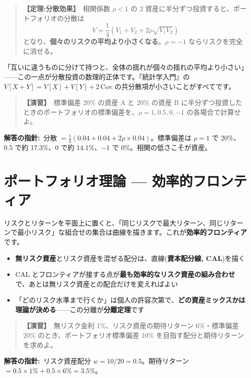 \documentclass{article}
\begin{document}
\begin{quote}
\textbf{【定理:分散効果】}\ 相関係数 \(\rho < 1\) の 2 資産に半分ずつ投資すると、ポートフォリオの分散は
\[ V = \frac{1}{4}(V_1 + V_2 + 2\rho\sqrt{V_1 V_2}) \]
となり、\textbf{個々のリスクの平均より小さくなる}。\(\rho = -1\) ならリスクを完全に消せる。
\end{quote}

「互いに違うものに分けて持つと、全体の揺れが個々の揺れの平均より小さい」——この一点が分散投資の数理的正体です。『統計学入門』の \(V[X+Y] = V[X] + V[Y] + 2\,\mathrm{Cov}\) の共分散項が小さいことがすべてです。

\begin{quote}
\textbf{【演習】}\ 標準偏差 20\% の資産 A と 20\% の資産 B に半分ずつ投資したときのポートフォリオの標準偏差を、\(\rho = 1, 0.5, 0, -1\) の各場合で計算せよ。
\end{quote}

\textbf{解答の指針:}\ 分散 \(= \frac{1}{4}(0.04 + 0.04 + 2\rho \times 0.04)\)。標準偏差は \(\rho = 1\) で 20\%、0.5 で約 17.3\%、0 で約 14.1\%、−1 で 0\%。相関の低さこそが資産。

\section{ポートフォリオ理論 — 効率的フロンティア}

リスクとリターンを平面上に置くと、「同じリスクで最大リターン、同じリターンで最小リスク」な組合せの集合は曲線を描きます。これが\textbf{効率的フロンティア}です。

\begin{itemize}
\item \textbf{無リスク資産}とリスク資産を混ぜる配分は、直線(\textbf{資本配分線, CAL})を描く
\item CAL とフロンティアが接する点が\textbf{最も効率的なリスク資産の組み合わせ}で、あとは無リスク資産との配合だけを変えればよい
\item 「どのリスク水準まで行くか」は個人の許容次第で、\textbf{どの資産ミックスかは理論が決める}——この分離が\textbf{分離定理}です
\end{itemize}

\begin{quote}
\textbf{【演習】}\ 無リスク金利 1\%、リスク資産の期待リターン 6\%・標準偏差 20\% のとき、ポートフォリオ標準偏差 10\% を目指す配分と期待リターンを求めよ。
\end{quote}

\textbf{解答の指針:}\ リスク資産配分 \(w = 10/20 = 0.5\)。期待リターン \(= 0.5 \times 1\% + 0.5 \times 6\% = 3.5\%\)。
\end{document}
